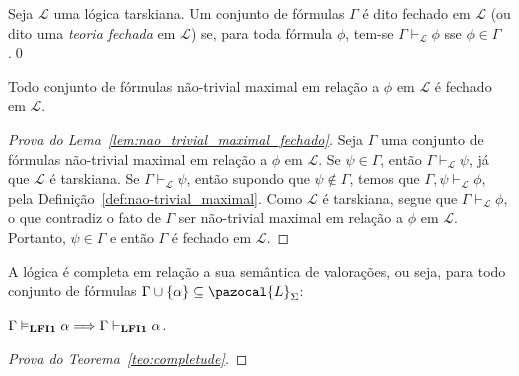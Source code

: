     \begin{definicao}\label{def:fechada}

        Seja $\mathcal{L}$ uma lógica tarskiana. Um conjunto de fórmulas $\Gamma$ é dito fechado em $\mathcal{L}$ (ou dito uma \textit{teoria fechada} em $\mathcal{L}$) se, para toda fórmula $\phi$, tem-se $\Gamma \vdash_{\mathcal{L}} \phi$ sse $\phi \in \Gamma$.\qed{}
    \end{definicao}

    \begin{lema}\label{lem:nao_trivial_maximal_fechado}
        Todo conjunto de fórmulas não-trivial maximal em relação a $\phi$ em $\mathcal{L}$ é fechado em $\mathcal{L}$.
    \end{lema}

    \begin{proof}[Prova do Lema~\ref{lem:nao_trivial_maximal_fechado}]
        Seja $\Gamma$ uma conjunto de fórmulas não-trivial maximal em relação a $\phi$ em $\mathcal{L}$. Se $\psi \in \Gamma$, então $\Gamma \vdash_{\mathcal{L}} \psi$, já que $\mathcal{L}$ é tarskiana. Se $\Gamma \vdash_{\mathcal{L}} \psi$, então supondo que $\psi \notin \Gamma$, temos que $\Gamma, \psi \vdash_{\mathcal{L}} \phi$, pela Definição~\ref{def:nao-trivial_maximal}. Como $\mathcal{L}$ é tarskiana, segue que $\Gamma \vdash_{\mathcal{L}} \phi$, o que contradiz o fato de $\Gamma$ ser não-trivial maximal em relação a $\phi$ em $\mathcal{L}$. Portanto, $\psi \in \Gamma$ e então $\Gamma$ é fechado em $\mathcal{L}$.
    \end{proof}


    \begin{teorema}[Completude]\label{teo:completude}
        A lógica {\normalfont\lfium{}} é completa em relação a sua semântica de valorações, ou seja, para todo conjunto de fórmulas $\Gamma \cup \{\alpha\} \subseteq \pazocal{L}_{\Sigma}$:

        \centering
        {\normalfont{} $\Gamma \vDash_{{\normalfont\textbf{LFI1}}{}} \alpha \Longrightarrow \Gamma \vdash_{{\normalfont\textbf{LFI1}}{}} \alpha$.}
    \end{teorema}

    \begin{proof}[Prova do Teorema~\ref{teo:completude}]
         

    \end{proof}


